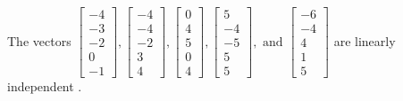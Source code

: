 \begin{exercise}
\begin{exerciseStatement}
  \end{exerciseStatement}
  \begin{exerciseAnswer}
   The vectors \(\left[\begin{array}{r}
-4 \\
-3 \\
-2 \\
0 \\
-1
\end{array}\right] , \left[\begin{array}{r}
-4 \\
-4 \\
-2 \\
3 \\
4
\end{array}\right] , \left[\begin{array}{r}
0 \\
4 \\
5 \\
0 \\
4
\end{array}\right] , \left[\begin{array}{r}
5 \\
-4 \\
-5 \\
5 \\
5
\end{array}\right] , \text{ and } \left[\begin{array}{r}
-6 \\
-4 \\
4 \\
1 \\
5
\end{array}\right]\) are 
  	 linearly independent  .
  


  \end{exerciseAnswer}
\end{exercise}